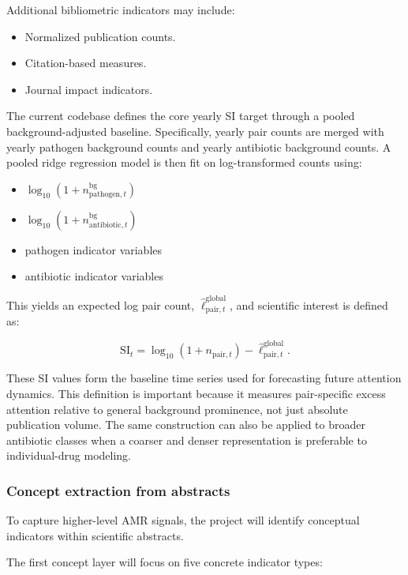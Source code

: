 \documentclass[
]{article}
\providecommand{\tightlist}{%
  \setlength{\itemsep}{0pt}\setlength{\parskip}{0pt}}
\begin{document}
Additional bibliometric indicators may include:

\begin{itemize}
\tightlist
\item
  Normalized publication counts.
\item
  Citation-based measures.
\item
  Journal impact indicators.
\end{itemize}

The current codebase defines the core yearly SI target through a pooled
background-adjusted baseline. Specifically, yearly pair counts are
merged with yearly pathogen background counts and yearly antibiotic
background counts. A pooled ridge regression model is then fit on
log-transformed counts using:

\begin{itemize}
\tightlist
\item
  \(\log_{10}(1 + n_{\mathrm{pathogen},t}^{\mathrm{bg}})\)
\item
  \(\log_{10}(1 + n_{\mathrm{antibiotic},t}^{\mathrm{bg}})\)
\item
  pathogen indicator variables
\item
  antibiotic indicator variables
\end{itemize}

This yields an expected log pair count,
\( \widehat{\ell}_{\mathrm{pair},t}^{\mathrm{global}} \), and
scientific interest is
defined as:

\[
\mathrm{SI}_t
= \log_{10}(1 + n_{\mathrm{pair},t})
- \widehat{\ell}_{\mathrm{pair},t}^{\mathrm{global}}.
\]

These SI values form the baseline time series used for forecasting
future attention dynamics. This definition is important because it
measures pair-specific excess attention relative to general background
prominence, not just absolute publication volume. The same construction
can also be applied to broader antibiotic classes when a coarser and
denser representation is preferable to individual-drug modeling.

\subsubsection{Concept extraction from
abstracts}\label{43-concept-extraction-from-abstracts}

To capture higher-level AMR signals, the project will identify
conceptual indicators within scientific abstracts.

The first concept layer will focus on five concrete indicator types:
\end{document}
